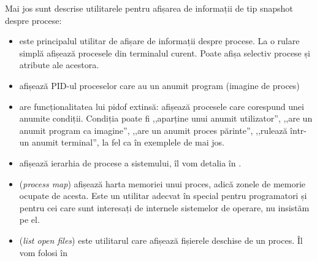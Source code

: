 Mai jos sunt descrise utilitarele pentru afișarea de informații de tip snapshot
despre procese:

\begin{itemize}
  \item {} este principalul utilitar de afișare de informații despre
		procese. La o rulare simplă afișează procesele din terminalul
		curent. Poate afișa selectiv procese și atribute ale acestora.
  \item {} afișează PID-ul proceselor care au un anumit program
		(imagine de proces)
  \item {} are funcționalitatea lui pidof extinsă: afișează procesele
		care corespund unei anumite condiții. Condiția poate fi
		,,aparține unui anumit utilizator'', ,,are un anumit program ca
		imagine'', ,,are un anumit proces părinte'', ,,rulează într-un
		anumit terminal'', la fel ca în exemplele de mai jos.
  \item {} afișează ierarhia de procese a sistemului, îl vom detalia
		în .
  \item {} (\textit{process map}) afișează harta memoriei unui proces,
		adică zonele de memorie ocupate de acesta. Este un utilitar
		adecvat în special pentru programatori și pentru cei care sunt
		interesați de internele sistemelor de operare, nu insistăm pe
		el.
  \item {} (\textit{list open files}) este utilitarul care afișează
		fișierele deschise de un proces. Îl vom folosi în
\end{itemize}

